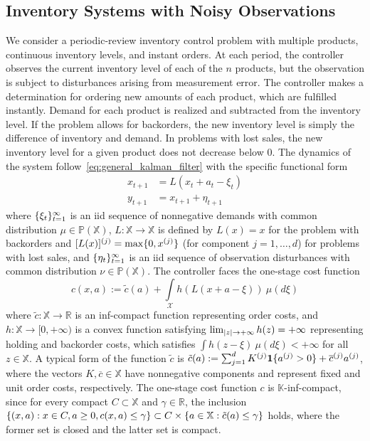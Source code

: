 \documentclass[11pt,onecolumn]{IEEEtran}  %
\newcommand{\Kb}{\mathbb{K}}
\newcommand{\Pb}{\mathbb{P}}
\newcommand{\Rb}{\mathbb{R}}
\newcommand{\Xb}{\mathbb{X}}
\newcommand{\Xc}{\mathcal{X}}
\renewcommand{\bar}{\overline}
\newcommand{\one}[1]{\mathbf{1}\set{#1}}
\newcommand{\defeq}{:=}%
\DeclarePairedDelimiter{\set}{\{}{\}}
\DeclarePairedDelimiter{\abs}{|}{|}
\theoremstyle{definition}
\begin{document}
\subsection{Inventory Systems with Noisy Observations} \label{subsec:inventory_systems}

We consider a periodic-review inventory control problem with multiple products, continuous inventory levels, and instant orders. At each period, the controller observes the current inventory level of each of the $n$ products, but the observation is subject to disturbances arising from measurement error. The controller makes a determination for ordering new amounts of each product, which are fulfilled instantly. Demand for each product is realized and subtracted from the inventory level. If the problem allows for backorders, the new inventory level is simply the difference of inventory and demand. In problems with lost sales, the new inventory level for a given product does not decrease below 0. The dynamics of the system follow~\eqref{eq:general_kalman_filter} with the specific functional form
\begin{subequations} \label{eq:inventory_model}
    \begin{align}
        x_{t+1} &= L(x_{t} + a_{t} - \xi_t) \\
        y_{t+1} &= x_{t+1} + \eta_{t+1}
    \end{align}
\end{subequations}
where $\set{\xi_t}_{t=1}^{\infty}$ is an iid sequence of nonnegative demands with common distribution $\mu \in \Pb(\Xb)$, $L : \Xb \to \Xb$ is defined by $L(x) = x$ for the problem with backorders and $[L(x)]^{(j)} = \max\set{0,x^{(j)}}$ (for component $j=1,\dots,d$) for problems with lost sales, and $\set{\eta_t}_{t=1}^{\infty}$ is an iid sequence of observation disturbances with common distribution $\nu \in \Pb(\Xb)$. The controller faces the one-stage cost function
\begin{equation} \label{eq:inventory_costs}
    c(x,a) \defeq
    \tilde{c}(a) + \int\limits_{\Xc}  h(L(x+a-\xi)) \ \mu(d\xi)
\end{equation}
where $\tilde{c} : \Xb \to \Rb$ is an inf-compact function representing order  costs, and $h : \Xb \to [0,+\infty)$ is a convex function satisfying $\lim_{\abs{z} \to +\infty} h(z) = +\infty$ representing holding and backorder costs, which satisfies $\int h(z-\xi) \ \mu(d\xi) < +\infty$ for all $z \in \Xb$. A typical form of the function $\tilde{c}$ is $\tilde{c}(a) \defeq \sum_{j=1}^{d} K^{(j)}\one{a^{(j)} > 0} + \bar c^{(j)} a^{(j)}$, where the vectors $K, \bar c \in \Xb$ have nonnegative components and represent fixed and unit order costs, respectively. The one-stage cost function $c$ is $\Kb$-inf-compact, since for every compact $C \subset \Xb$ and $\gamma \in \Rb$, the inclusion $\set{(x,a) : x \in C, a \geq 0, c(x,a) \leq \gamma} \subset C \times \set{a \in \Xb: \tilde{c}(a) \leq \gamma}$ holds, where the former set is closed and the latter set is compact.
\end{document}
